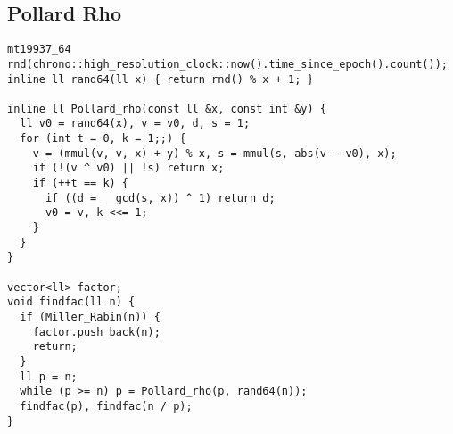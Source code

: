 \subsection{Pollard Rho}
\begin{lstlisting}
mt19937_64 rnd(chrono::high_resolution_clock::now().time_since_epoch().count());
inline ll rand64(ll x) { return rnd() % x + 1; }

inline ll Pollard_rho(const ll &x, const int &y) {
  ll v0 = rand64(x), v = v0, d, s = 1;
  for (int t = 0, k = 1;;) {
    v = (mmul(v, v, x) + y) % x, s = mmul(s, abs(v - v0), x);
    if (!(v ^ v0) || !s) return x;
    if (++t == k) {
      if ((d = __gcd(s, x)) ^ 1) return d;
      v0 = v, k <<= 1;
    }
  }
}

vector<ll> factor;
void findfac(ll n) {
  if (Miller_Rabin(n)) {
    factor.push_back(n);
    return;
  }
  ll p = n;
  while (p >= n) p = Pollard_rho(p, rand64(n));
  findfac(p), findfac(n / p);
}
\end{lstlisting}
